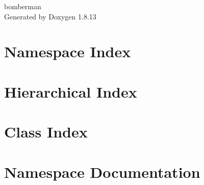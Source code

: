\documentclass[twoside]{book}
\newcommand{\+}{\discretionary{\mbox{\scriptsize$\hookleftarrow$}}{}{}}
\newcommand{\clearemptydoublepage}{%
  \newpage{\pagestyle{empty}\cleardoublepage}%
}
\begin{document}
\hypersetup{pageanchor=false,
             bookmarksnumbered=true,
             pdfencoding=unicode
            }
\begin{titlepage}
\vspace*{7cm}
\begin{center}%
{\Large bomberman }\\
\vspace*{1cm}
{\large Generated by Doxygen 1.8.13}\\
\end{center}
\end{titlepage}
\clearemptydoublepage
{}
\tableofcontents
\clearemptydoublepage
{}
\hypersetup{pageanchor=true}

\chapter{Namespace Index}

\chapter{Hierarchical Index}

\chapter{Class Index}

\chapter{Namespace Documentation}


\end{document}
